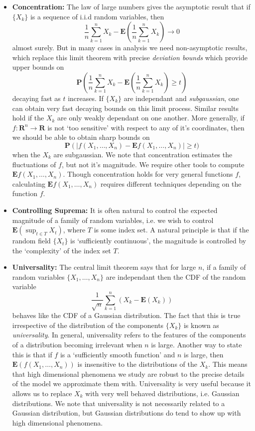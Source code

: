 \begin{itemize}
    \item[] \textbf{Concentration:} The law of large numbers gives the asymptotic result that if $\{ X_k \}$ is a sequence of i.i.d random variables, then
    \[ \frac{1}{n} \sum_{k = 1}^n X_k - \mathbf{E} \left( \frac{1}{n} \sum_{k = 1}^n X_k \right) \to 0 \]
    almost surely. But in many cases in analysis we need non-asymptotic results, which replace this limit theorem with precise {\it deviation bounds} which provide upper bounds on
    \[ \mathbf{P} \left( \frac{1}{n} \sum_{k = 1}^n X_k - \mathbf{E} \left( \frac{1}{n} \sum_{k = 1}^n X_k \right) \geq t \right) \]
    decaying fast as $t$ increases. If $\{ X_k \}$ are independant and {\it subgaussian}, one can obtain very fast decaying bounds on this limit process. Similar results hold if the $X_k$ are only weakly dependant on one another. More generally, if $f: \mathbf{R}^n \to \mathbf{R}$ is not `too sensitive' with respect to any of it's coordinates, then we should be able to obtain sharp bounds on
    \[ \mathbf{P} \left(|f(X_1, \dots, X_n) - \mathbf{E} f(X_1, \dots, X_n) \right| \geq t) \]
    when the $X_k$ are subgaussian. We note that concentration estimates the fluctuations of $f$, but not it's magnitude. We require other tools to compute $\mathbf{E} f(X_1, \dots, X_n)$. Though concentration holds for very general functions $f$, calculating $\mathbf{E} f(X_1, \dots, X_n)$ requires different techniques depending on the function $f$.

    \item[] \textbf{Controlling Suprema:} It is often natural to control the expected magnitude of a family of random variables, i.e. we wish to control $\mathbf{E} (\sup_{t \in T} X_t)$, where $T$ is some index set.  A natural principle is that if the random field $\{ X_t \}$ is `sufficiently continuous', the magnitude is controlled by the `complexity' of the index set $T$.

    \item[] \textbf{Universality:} The central limit theorem says that for large $n$, if a family of random variables $\{ X_1, \dots, X_n \}$ are independant then the CDF of the random variable
    \[ \frac{1}{\sqrt{n}} \sum_{k = 1}^n (X_k - \mathbf{E}(X_k)) \]
    behaves like the CDF of a Gaussian distribution. The fact that this is true irrespective of the distribution of the components $\{ X_k \}$ is known as {\it universality}. In general, universality refers to the features of the components of a distribution becoming irrelevant when $n$ is large. Another way to state this is that if $f$ is a `sufficiently smooth function' and $n$ is large, then $\mathbf{E}(f(X_1, \dots, X_n))$ is insensitive to the distributions of the $X_k$. This means that high dimensional phenomena we study are robust to the precise details of the model we approximate them with. Universality is very useful because it allows us to replace $X_k$ with very well behaved distributions, i.e. Gaussian distributions. We note that universality is not necessarily related to a Gaussian distribution, but Gaussian distributions do tend to show up with high dimensional phenomena.


\end{itemize}
